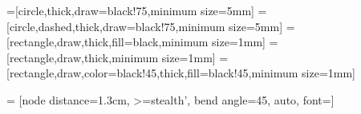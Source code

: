 
=[circle,thick,draw=black!75,minimum size=5mm]
=[circle,dashed,thick,draw=black!75,minimum size=5mm]
=[rectangle,draw,thick,fill=black,minimum size=1mm]
=[rectangle,draw,thick,minimum size=1mm]
=[rectangle,draw,color=black!45,thick,fill=black!45,minimum size=1mm]

=
 [node distance=1.3cm, >=stealth', bend angle=45, auto,
  font=\fontsize{8}{8}\selectfont]

\newcommand{\eg}{\emph{e.g.,}\xspace}
\newcommand{\ie}{\emph{i.e.,}\xspace}
\newcommand{\cf}{\emph{cf.}\xspace}

\newcommand{\ctx}[1]{\texttt{\textsc{#1}}}

\newcommand{\enabled}[2]{$#1[#2\rangle$}
\newcommand{\flik}{\textsc{Flik}\xspace}



\newcommand{\authorcomment}[3][comment]
  {\ifdraft{\noindent
      \fbox{\footnotesize\textcolor{author}{\textsc{#2}}}
      \textcolor{#1}{\textsl{#3}}}{}}



\let\orig@figure\figure
\renewcommand*{\figure}[1][]{\orig@figure[#1]\vspace{-1ex}} %
\let\orig@endfigure\endfigure
\renewcommand*{\endfigure}{\vspace{-1.5ex}\orig@endfigure} %

\let\orig@endlstlisting\endlstlisting
\renewcommand*{\endlstlisting}{\vspace{-3ex}\orig@endlstlisting} %

\usepackage{caption}
\captionsetup[figure]{aboveskip=0.0em,belowskip=-0em}
\captionsetup[table]{aboveskip=0em,belowskip=-0em}



\makeatother